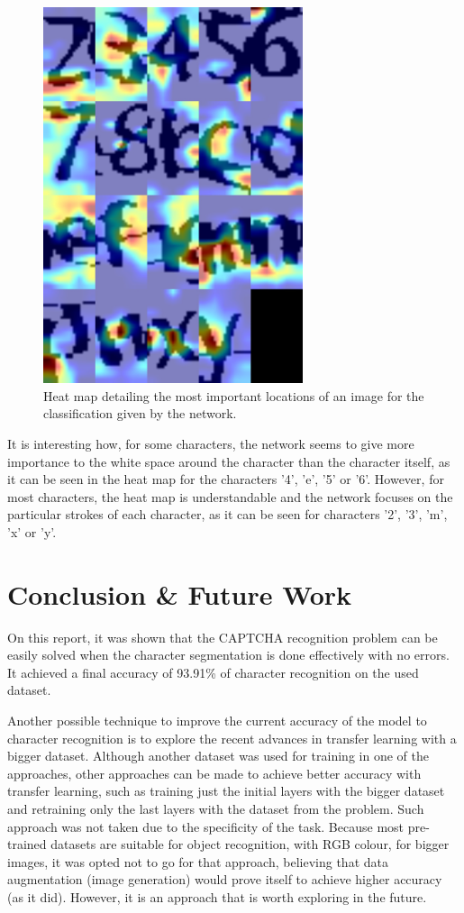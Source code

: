 \documentclass[journal]{IEEEtran}
\begin{document}
\begin{figure}[!t]
\centering
\includegraphics[width=3in]{images/heatmaps}
\caption{Heat map detailing the most important locations of an image for the classification given by the network.}
\label{heatmap}
\end{figure}

It is interesting how, for some characters, the network seems to give more importance to the white space around the character than the character itself, as it can be seen in the heat map for the characters '4', 'e', '5' or '6'. However, for most characters, the heat map is understandable and the network focuses on the particular strokes of each character, as it can be seen for characters '2', '3', 'm', 'x' or 'y'. 

\section{Conclusion \& Future Work}

On this report, it was shown that the CAPTCHA recognition problem can be easily solved when the character segmentation is done effectively with no errors. It achieved a final accuracy of 93.91\% of character recognition on the used dataset.

Another possible technique to improve the current accuracy of the model to character recognition is to explore the recent advances in transfer learning with a bigger dataset. Although another dataset was used for training in one of the approaches, other approaches can be made to achieve better accuracy with transfer learning, such as training just the initial layers with the bigger dataset and retraining only the last layers with the dataset from the problem. Such approach was not taken due to the specificity of the task. Because most pre-trained datasets are suitable for object recognition, with RGB colour, for bigger images, it was opted not to go for that approach, believing that data augmentation (image generation) would prove itself to achieve higher accuracy (as it did). However, it is an approach that is worth exploring in the future.
\end{document}
